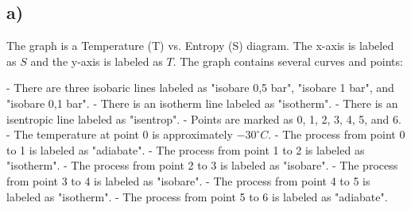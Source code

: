 

\subsection*{a)}

The graph is a Temperature (T) vs. Entropy (S) diagram. The x-axis is labeled as $S$ and the y-axis is labeled as $T$. The graph contains several curves and points:

- There are three isobaric lines labeled as "isobare 0,5 bar", "isobare 1 bar", and "isobare 0,1 bar".
- There is an isotherm line labeled as "isotherm".
- There is an isentropic line labeled as "isentrop".
- Points are marked as 0, 1, 2, 3, 4, 5, and 6.
- The temperature at point 0 is approximately $-30^\circ C$.
- The process from point 0 to 1 is labeled as "adiabate".
- The process from point 1 to 2 is labeled as "isotherm".
- The process from point 2 to 3 is labeled as "isobare".
- The process from point 3 to 4 is labeled as "isobare".
- The process from point 4 to 5 is labeled as "isotherm".
- The process from point 5 to 6 is labeled as "adiabate".